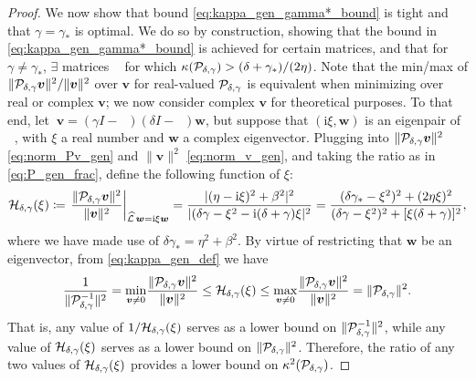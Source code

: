 \documentclass[a4paper,10pt]{article}
\DeclareMathOperator{\cL}{\widehat{\mathcal{L}}}
\begin{document}
\begin{proof}
We now show that bound \eqref{eq:kappa_gen_gamma*_bound} is tight and that
$\gamma = \gamma_*$ is optimal. We do so by construction, showing that the
bound in \eqref{eq:kappa_gen_gamma*_bound} is achieved for certain matrices, and 
that for $\gamma\neq\gamma_*$, $\exists$ matrices $\cL$ for which
$\kappa({\cal P}_{\delta, \gamma}) > (\delta + \gamma_*)/(2\eta)$. Note that the min/max 
of $\Vert {\cal P}_{\delta,\gamma} \bm{v} \Vert^2/\Vert \bm{v} \Vert^2$ over $\bm{v}$
for real-valued ${\cal P}_{\delta,\gamma}$ is equivalent when minimizing over real
or complex $\bm{v}$; we now consider complex $\bm{v}$ for theoretical
purposes. To that end, let $~\bm{v}=(\gamma I - \cL)(\delta I - \cL) \bm{w}$, but 
suppose that $(\textrm{i} \xi, \bm{w})$ is an eigenpair of $\cL$, with $\xi$
a real number and $\bm{w}$ a complex eigenvector. Plugging into
$\| {\cal P}_{\delta,\gamma} \bm{v}\|^2$ \eqref{eq:norm_Pv_gen} and $\|\bm{v}\|^2$
\eqref{eq:norm_v_gen}, and taking the ratio as in \eqref{eq:P_gen_frac},
define the following function of $\xi$:
%
\begin{align} \label{eq:H_gen_def}
{\cal H}_{\delta,\gamma}(\xi) 
\coloneqq 
\left. \frac{\Vert {\cal P}_{\delta, \gamma} \bm{v} \Vert^2 }{\Vert \bm{v} \Vert^2} \right|_{\cL \bm{w} = \mathrm{i} \xi \bm{w}}
=
\frac{|(\eta- \mathrm{i} \xi)^2 + \beta^2|^2}{|(\delta \gamma - \xi^2 - \mathrm{i} (\delta + \gamma) \xi|^2}
=
\frac{(\delta \gamma_* - \xi^2)^2 + (2 \eta \xi)^2}{(\delta \gamma-\xi^2)^2 + [\xi ( \delta + \gamma) ]^2},
\end{align}
where we have made use of $\delta \gamma_* = \eta^2 + \beta^2$.
By virtue of restricting that $\bm{w}$ be an eigenvector, from \eqref{eq:kappa_gen_def} we have
\begin{align}
\label{eq:H_gen_bounds}
\frac{1}{\Vert {\cal P}_{\delta,\gamma}^{-1} \Vert^2}
=
\underset{\bm{v} \neq 0}{\min} \frac{\Vert {\cal P}_{\delta,\gamma} \bm{v} \Vert^2}{\Vert \bm{v} \Vert^2}
\leq {\cal H}_{\delta,\gamma}(\xi) \leq 
\underset{\bm{v} \neq 0}{\max} \frac{\Vert {\cal P}_{\delta,\gamma} \bm{v} \Vert^2}{\Vert \bm{v} \Vert^2} = \Vert {\cal P}_{\delta,\gamma} \Vert^2.
\end{align}
%
That is, any value of $1/{\cal H}_{\delta,\gamma}(\xi)$ serves as a lower bound on
$\Vert {\cal P}_{\delta,\gamma}^{-1} \Vert^2$, while any value of ${\cal
H}_{\delta,\gamma}(\xi)$ serves as a lower bound on $\Vert {\cal P}_{\delta,\gamma} \Vert^2$.
Therefore, the ratio of any two values of ${\cal H}_{\delta,\gamma}(\xi)$ provides a
lower bound on $\kappa^2({\cal P}_{\delta,\gamma})$.


\end{proof}
\end{document}
